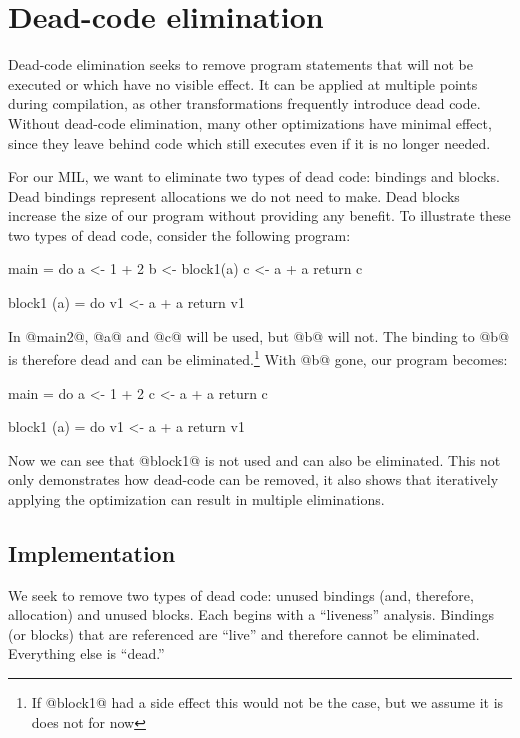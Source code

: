 \documentclass[12pt]{report}
\begin{document}


\chapter{Dead-code elimination}

Dead-code elimination seeks to remove program statements that will not
be executed or which have no visible effect. It can be applied at
multiple points during compilation, as other transformations
frequently introduce dead code. Without dead-code elimination, many
other optimizations have minimal effect, since they leave behind code
which still executes even if it is no longer needed.

For our MIL, we want to eliminate two types of dead code: bindings and
blocks. Dead bindings represent allocations we do not need to
make. Dead blocks increase the size of our program without providing
any benefit. To illustrate these two types of dead code, consider
the following program:

\begin{code}
main = do
  a <- 1 + 2
  b <- block1(a)
  c <- a + a
  return c

block1 (a) = do
  v1 <- a + a
  return v1
\end{code}

In @main2@, @a@ and @c@ will be used, but @b@ will not. The binding to
@b@ is therefore dead and can be eliminated.\footnote{If @block1@ had
  a side effect this would not be the case, but we assume it is does
  not for now} With @b@ gone, our program becomes:

\begin{code}
main = do
  a <- 1 + 2
  c <- a + a
  return c

block1 (a) = do
  v1 <- a + a
  return v1
\end{code}

Now we can see that @block1@ is not used and can also be
eliminated. This not only demonstrates how dead-code can be removed,
it also shows that iteratively applying the optimization can result in
multiple eliminations.

\section{Implementation}
We seek to remove two types of dead code: unused bindings (and,
therefore, allocation) and unused blocks. Each begins with a
``liveness'' analysis. Bindings (or blocks) that are referenced are ``live''
and therefore cannot be eliminated. Everything else is ``dead.''
\end{document}
